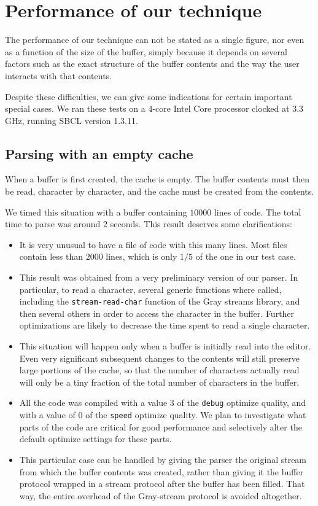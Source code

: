 \section{Performance of our technique}

The performance of our technique can not be stated as a single figure,
nor even as a function of the size of the buffer, simply because it
depends on several factors such as the exact structure of the buffer
contents and the way the user interacts with that contents.

Despite these difficulties, we can give some indications for certain
important special cases.  We ran these tests on a $4$-core Intel Core
processor clocked at $3.3$GHz, running SBCL version 1.3.11.

\subsection{Parsing with an empty cache}

When a buffer is first created, the cache is empty.  The buffer
contents must then be read, character by character, and the cache must
be created from the contents.

We timed this situation with a buffer containing $10000$ lines of
\commonlisp{} code.  The total time to parse was around $2$ seconds.
This result deserves some clarifications:

\begin{itemize}
\item It is very unusual to have a file of \commonlisp{} code with
  this many lines.  Most files contain less than $2000$ lines, which
  is only $1/5$ of the one in our test case.
\item This result was obtained from a very preliminary version of our
  parser.  In particular, to read a character, several generic
  functions where called, including the \texttt{stream-read-char}
  function of the Gray streams library, and then several others in
  order to access the character in the buffer.  Further optimizations
  are likely to decrease the time spent to read a single character.
\item This situation will happen only when a buffer is initially read
  into the editor.  Even very significant subsequent changes to the
  contents will still preserve large portions of the cache, so that
  the number of characters actually read will only be a tiny fraction
  of the total number of characters in the buffer.
\item All the code was compiled with a value $3$ of the \texttt{debug}
  optimize quality, and with a value of $0$ of the \texttt{speed}
  optimize quality.  We plan to investigate what parts of the code are
  critical for good performance and selectively alter the default
  optimize settings for these parts.
\item This particular case can be handled by giving the parser the
  original stream from which the buffer contents was created, rather
  than giving it the buffer protocol wrapped in a stream protocol
  after the buffer has been filled.  That way, the entire overhead of
  the Gray-stream protocol is avoided altogether.
\end{itemize}

